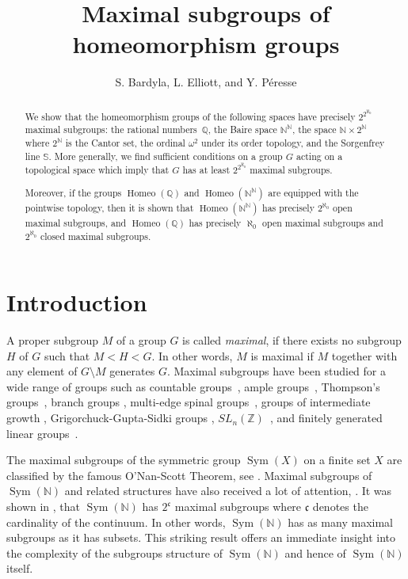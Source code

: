 \documentclass[11pt]{amsart}
\title{Maximal subgroups of homeomorphism groups}
\author{S. Bardyla, L. Elliott, and Y. P\'eresse}
\theoremstyle{definition}
\newcommand{\Homeo}{\operatorname{Homeo}}
\newcommand{\N}{\mathbb N}
\newcommand{\Q}{\mathbb Q}
\newcommand{\Z}{\mathbb Z}
\newcommand{\Sym}{\operatorname{Sym}}
\begin{document}
\begin{abstract}
We show that the homeomorphism groups of the following spaces have precisely $2^{2^{\aleph_0}}$ maximal subgroups: the rational numbers~$\Q$, the Baire space $\N^{\N}$, the space $\N\times 2^{\N}$ where $2^{\N}$ is the Cantor set, the ordinal $\omega^2$ under its order topology, and the Sorgenfrey line $\mathbb{S}$. More generally, we find sufficient conditions on a group $G$ acting on a topological space which imply that $G$ has at least $2^{2^{\aleph_0}}$ maximal subgroups.

Moreover, if the groups $\Homeo(\Q)$ and $\Homeo(\N^\N)$ are equipped with the pointwise topology, then it is shown that $\Homeo(\N^\N)$ has precisely $2^{\aleph_0}$ open maximal subgroups, and $\Homeo(\Q)$ has precisely $\aleph_0$ open maximal subgroups and $2^{\aleph_0}$ closed maximal subgroups.
\end{abstract}


\maketitle


\tableofcontents
\section{Introduction}

A proper subgroup $M$ of a group $G$ is called {\em maximal}, if there exists no subgroup $H$ of $G$ such that $M<H<G$. In other words, $M$ is maximal if $M$ together with any element of $G \setminus M$ generates $G$. Maximal subgroups have been studied for a wide range of groups such as countable groups~\cite{GGS}, ample groups~\cite{GV}, Thompson's groups~\cite{A,belk2025type}, branch groups \cite{F}, multi-edge spinal groups~\cite{AKT}, groups of intermediate growth \cite{FG}, Grigorchuck-Gupta-Sidki groups \cite{FT}, $SL_n(\Z)$~\cite{GM}, and finitely generated linear groups~\cite{MS}.

The maximal subgroups of the symmetric group $\Sym(X)$ on a finite set $X$ are classified by the famous O'Nan-Scott Theorem, see \cite{Liebeck_Praeger_Saxl_1988}. Maximal subgroups of $\Sym(\N)$ and related structures have also received a lot of attention, \cite{BST, EMP, HP, KK, LS, MP}. 
It was shown in \cite{subgroups_macpherson_neumann}, that $\Sym(\N)$ has $2^{\mathfrak{c}}$ maximal subgroups where $\mathfrak c$ denotes the cardinality of the continuum. In other words, $\Sym(\N)$ has as many maximal subgroups as it has subsets. This striking result offers an immediate insight into the complexity of the subgroups structure of $\Sym(\N)$ and hence of $\Sym(\N)$ itself. 
\end{document}
